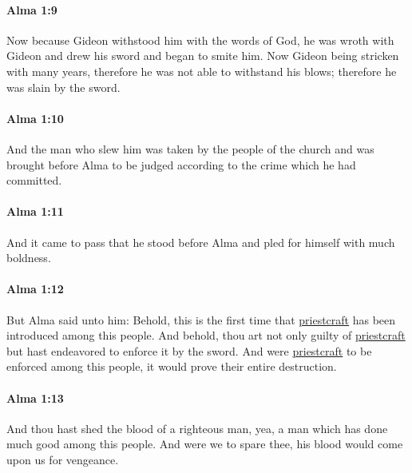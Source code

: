 		\paragraph{Alma 1:9} %
			\label{ALMA-1-9}

			Now because Gideon withstood him with the words of God,
			he was wroth with Gideon and drew his sword and began to smite him.
			Now Gideon being stricken with many years,
			therefore he was not able to withstand his blows;
			therefore he was slain by the sword.

		\paragraph{Alma 1:10} %
			\label{ALMA-1-10}

			And the man who slew him was taken by the people of the church
			and was brought before Alma to be judged
			according to the crime which he had committed.

		\paragraph{Alma 1:11} %
			\label{ALMA-1-11}

			And it came to pass that
			he stood before Alma and pled for himself with much boldness.

		\paragraph{Alma 1:12} %
			\label{ALMA-1-12}

			But Alma said unto him:
			Behold, this is the first time that \hyperref[PRIESTCRAFT]{priestcraft} has been introduced among this people.
			And behold, thou art not only guilty of \hyperref[PRIESTCRAFT]{priestcraft}
			but hast endeavored to enforce it by the sword.
			And were \hyperref[PRIESTCRAFT]{priestcraft} to be enforced among this people,
			it would prove their entire destruction.

		\paragraph{Alma 1:13} %
			\label{ALMA-1-13}

			And thou hast shed the blood of a righteous man,
			yea, a man which has done much good among this people.
			And were we to spare thee,
			his blood would come upon us for vengeance.

